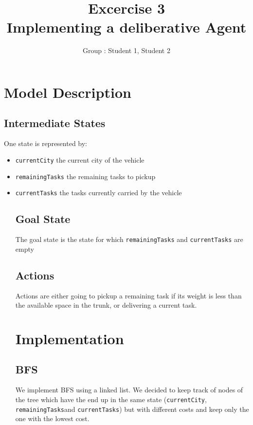 \documentclass[11pt]{article}
\title{\bf Excercise 3\\ Implementing a deliberative Agent}
\author{Group \textnumero : Student 1, Student 2}
\begin{document}
\maketitle

\section{Model Description}

\subsection{Intermediate States}
One state is represented by: 
\begin{itemize}
\item \verb|currentCity| the current city of the vehicle
\item \verb|remainingTasks| the remaining tasks to pickup
\item \verb|currentTasks| the tasks currently carried by the vehicle 

\subsection{Goal State}
The goal state is the state for which  \verb|remainingTasks| and \verb|currentTasks| are empty

\subsection{Actions}
Actions are either going to pickup a remaining task if its weight is less than the available space in the trunk, or delivering a current task.

\section{Implementation}

\subsection{BFS}
We implement BFS using a linked list. We decided to keep track of nodes of the tree which have the end up in the same state (\verb|currentCity|, \verb|remainingTasks|and \verb|currentTasks|) but with different costs and keep only the one with the lowest cost.


\end{itemize}
\end{document}
